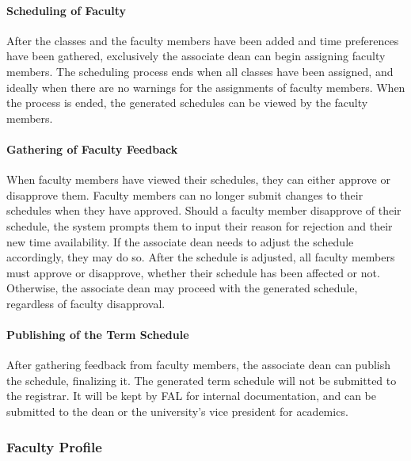         \paragraph{Scheduling of Faculty}
        After the classes and the faculty members have been added and time preferences have been gathered, exclusively the associate dean can begin assigning faculty members. The scheduling process ends when all classes have been assigned, and ideally when there are no warnings for the assignments of faculty members. When the process is ended, the generated schedules can be viewed by the faculty members.
        
        \paragraph{Gathering of Faculty Feedback}
        When faculty members have viewed their schedules, they can either approve or disapprove them. Faculty members can no longer submit changes to their schedules when they have approved. Should a faculty member disapprove of their schedule, the system prompts them to input their reason for rejection and their new time availability. If the associate dean needs to adjust the schedule accordingly, they may do so. After the schedule is adjusted, all faculty members must approve or disapprove, whether their schedule has been affected or not. Otherwise, the associate dean may proceed with the generated schedule, regardless of faculty disapproval.
        
        \paragraph{Publishing of the Term Schedule}
        After gathering feedback from faculty members, the associate dean can publish the schedule, finalizing it. The generated term schedule will not be submitted to the registrar. It will be kept by FAL for internal documentation, and can be submitted to the dean or the university's vice president for academics.

    \subsubsection{Faculty Profile}
